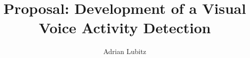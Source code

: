 \documentclass[master,english]{hgbthesis}
\title{Proposal: Development of a Visual Voice Activity Detection}
\author{Adrian Lubitz}
\begin{document}

\frontmatter							%

\maketitle
\tableofcontents

%
%

\mainmatter          			%


%
%
%
%
%
%
%
%
%




\MakeBibliography                        				%

%

\end{document}
